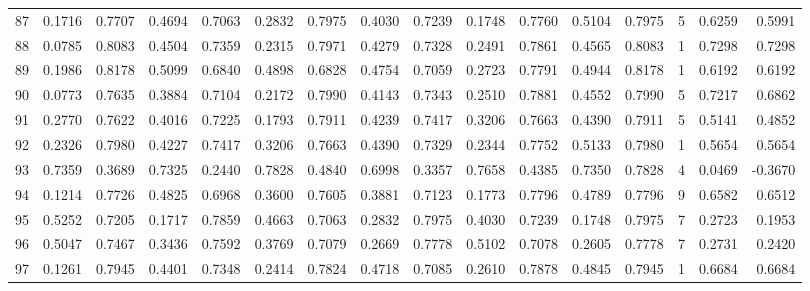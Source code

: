 \begin{tabular}{lrrrrrrrrrrrrrrr}
87  &      0.1716 &  0.7707 &  0.4694 &  0.7063 &  0.2832 &  0.7975 &  0.4030 &  0.7239 &  0.1748 &  0.7760 &   0.5104 &     0.7975 &      5 &                    0.6259 &                     0.5991 \\
88  &      0.0785 &  0.8083 &  0.4504 &  0.7359 &  0.2315 &  0.7971 &  0.4279 &  0.7328 &  0.2491 &  0.7861 &   0.4565 &     0.8083 &      1 &                    0.7298 &                     0.7298 \\
89  &      0.1986 &  0.8178 &  0.5099 &  0.6840 &  0.4898 &  0.6828 &  0.4754 &  0.7059 &  0.2723 &  0.7791 &   0.4944 &     0.8178 &      1 &                    0.6192 &                     0.6192 \\
90  &      0.0773 &  0.7635 &  0.3884 &  0.7104 &  0.2172 &  0.7990 &  0.4143 &  0.7343 &  0.2510 &  0.7881 &   0.4552 &     0.7990 &      5 &                    0.7217 &                     0.6862 \\
91  &      0.2770 &  0.7622 &  0.4016 &  0.7225 &  0.1793 &  0.7911 &  0.4239 &  0.7417 &  0.3206 &  0.7663 &   0.4390 &     0.7911 &      5 &                    0.5141 &                     0.4852 \\
92  &      0.2326 &  0.7980 &  0.4227 &  0.7417 &  0.3206 &  0.7663 &  0.4390 &  0.7329 &  0.2344 &  0.7752 &   0.5133 &     0.7980 &      1 &                    0.5654 &                     0.5654 \\
93  &      0.7359 &  0.3689 &  0.7325 &  0.2440 &  0.7828 &  0.4840 &  0.6998 &  0.3357 &  0.7658 &  0.4385 &   0.7350 &     0.7828 &      4 &                    0.0469 &                    -0.3670 \\
94  &      0.1214 &  0.7726 &  0.4825 &  0.6968 &  0.3600 &  0.7605 &  0.3881 &  0.7123 &  0.1773 &  0.7796 &   0.4789 &     0.7796 &      9 &                    0.6582 &                     0.6512 \\
95  &      0.5252 &  0.7205 &  0.1717 &  0.7859 &  0.4663 &  0.7063 &  0.2832 &  0.7975 &  0.4030 &  0.7239 &   0.1748 &     0.7975 &      7 &                    0.2723 &                     0.1953 \\
96  &      0.5047 &  0.7467 &  0.3436 &  0.7592 &  0.3769 &  0.7079 &  0.2669 &  0.7778 &  0.5102 &  0.7078 &   0.2605 &     0.7778 &      7 &                    0.2731 &                     0.2420 \\
97  &      0.1261 &  0.7945 &  0.4401 &  0.7348 &  0.2414 &  0.7824 &  0.4718 &  0.7085 &  0.2610 &  0.7878 &   0.4845 &     0.7945 &      1 &                    0.6684 &                     0.6684 \\

\end{tabular}
